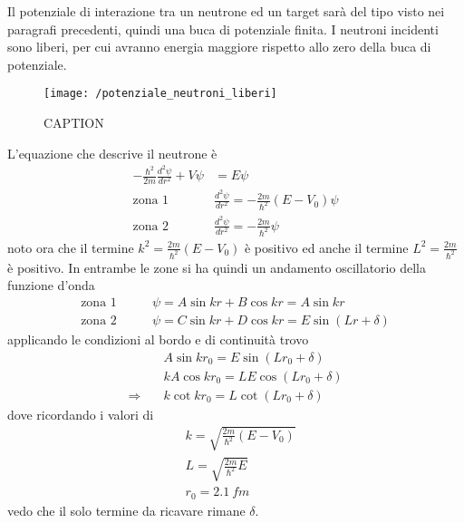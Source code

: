 Il potenziale di interazione tra un neutrone ed un target sarà del tipo visto nei paragrafi precedenti, quindi una buca di potenziale finita.
I neutroni incidenti sono liberi, per cui avranno energia maggiore rispetto allo zero della buca di potenziale.
\begin{figure}[h]
\centering
\texttt{[image: /potenziale\_neutroni\_liberi]}
\caption{CAPTION}
\end{figure}
L'equazione che descrive il neutrone è
\begin{equation}
\begin{split}
-\frac{\hbar^2}{2m} \frac{d^2 \psi}{dr^2} + V \psi & = E \psi \\
\mbox{zona 1} \quad\quad  & \frac{d^2 \psi}{dr^2} = - \frac{2m}{\hbar^2} (E-V_0) \psi \\
\mbox{zona 2} \quad\quad  & \frac{d^2 \psi}{dr^2} = - \frac{2m}{\hbar^2} \psi
\end{split}
\end{equation}
noto ora che il termine $ k^2 = \frac{2m}{\hbar^2} (E-V_0)$ è positivo ed anche il termine $L^2 = \frac{2m}{\hbar^2}$ è positivo.
In entrambe le zone si ha quindi un andamento oscillatorio della funzione d'onda
\begin{equation}
\begin{split}
\mbox{zona 1} \quad\quad  & \psi = A \sin k r + B \cos k r = A \sin k r \\
\mbox{zona 2} \quad\quad  & \psi = C \sin k r + D \cos k r = E \sin ( L r + \delta )
\end{split}
\end{equation}
applicando le condizioni al bordo e di continuità trovo
\begin{equation}
\begin{split}
& A \sin k r_0 = E \sin (L r_0 + \delta) \\
& k A \cos k r_0 = L E \cos (L r_0 + \delta) \\
\Rightarrow\quad & k \cot k r_0 = L \cot (L r_0 + \delta)
\end{split}
\end{equation}
dove ricordando i valori di 
\begin{equation}
\begin{split}
& k = \sqrt{\frac{2m}{\hbar^2}(E-V_0)} \\
& L = \sqrt{\frac{2m}{\hbar^2}E} \\
& r_0 = \SI{2.1}{fm}
\end{split}
\end{equation}
vedo che il solo termine da ricavare rimane $\delta$.

